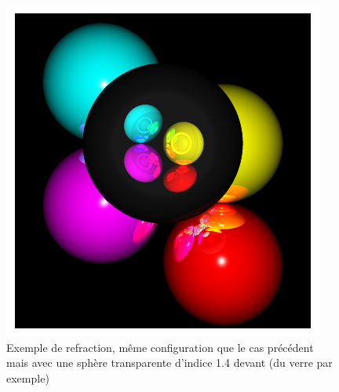 \documentclass[10pt,a4paper]{article}
\begin{document}
\begin{figure}[hbtp]
\centering
\includegraphics[scale=0.6]{erefraction.png}
\caption{Exemple de refraction, même configuration que le cas précédent mais avec une sphère transparente d'indice 1.4 devant (du verre par exemple)} \label{erefraction}
\end{figure}
\end{document}
